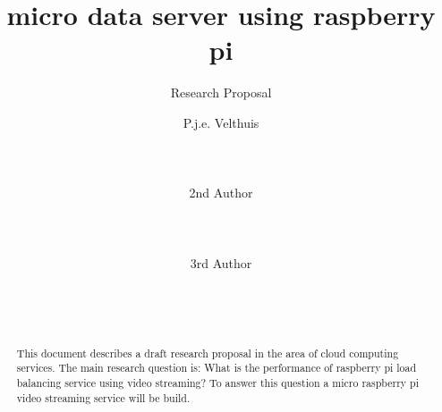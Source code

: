 \documentclass{sig-alternate-br}
\begin{document}
%

\title{micro data server using raspberry pi}
 \subtitle{Research Proposal}




\author{ 
%
%
\alignauthor P.j.e. Velthuis\\
       \\
       \\
       \\
\alignauthor 2nd Author\\
       \\
       \\
       \\
\alignauthor 3rd Author\\
       \\
       \\
       \\
}



\maketitle
\begin{abstract}
This document describes a draft research proposal in the
area of cloud computing services. The main research question
is: What is the performance of raspberry pi load balancing service using video streaming? To answer this question a micro raspberry pi video streaming service will be build. 
\end{abstract}
\end{document}
